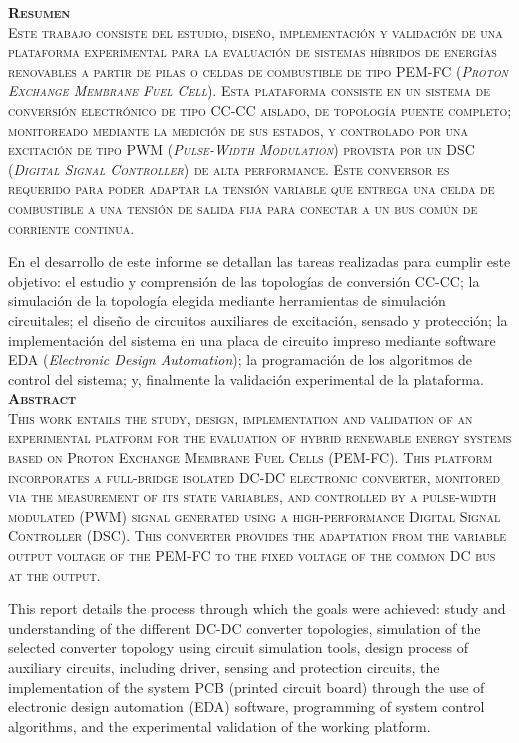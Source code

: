 \huge
\scshape
\textbf{Resumen}\\

\normalfont\normalsize
Este trabajo consiste del estudio, diseño, implementación y validación de una plataforma experimental para la evaluación de sistemas híbridos de energías renovables a partir de pilas o celdas de combustible de tipo PEM-FC (\textit{Proton Exchange Membrane Fuel Cell}). Esta plataforma consiste en un sistema de conversión electrónico de tipo CC-CC aislado, de topología puente completo; monitoreado mediante la medición de sus estados, y controlado por una excitación de tipo PWM (\textit{Pulse-Width Modulation}) provista por un DSC (\textit{Digital Signal Controller}) de alta performance. Este conversor es requerido para poder adaptar la tensión variable que entrega una celda de combustible a una tensión de salida fija para conectar a un bus común de corriente continua. 

En el desarrollo de este informe se detallan las tareas realizadas para cumplir este objetivo: el estudio y comprensión de las topologías de conversión CC-CC; la simulación de la topología elegida mediante herramientas de simulación circuitales; el diseño de circuitos auxiliares de excitación, sensado y protección; la implementación del sistema en una placa de circuito impreso mediante software EDA (\textit{Electronic Design Automation}); la programación de los algoritmos de control del sistema; y, finalmente la validación experimental de la plataforma.\\

\vspace{1cm}
\huge
\scshape
\textbf{Abstract}\\

\normalsize\normalfont
This work entails the study, design, implementation and validation of an experimental platform for the evaluation of hybrid renewable energy systems based on Proton Exchange Membrane Fuel Cells (PEM-FC). This platform incorporates a full-bridge isolated DC-DC electronic converter, monitored via the measurement of its state variables, and controlled by a pulse-width modulated (PWM) signal generated using a high-performance Digital Signal Controller (DSC). This converter provides the adaptation from the variable output voltage of the PEM-FC to the fixed voltage of the common DC bus at the output.

This report details the process through which the goals were achieved: study and understanding of the different DC-DC converter topologies, simulation of the selected converter topology using circuit simulation tools, design process of auxiliary circuits, including driver, sensing and protection circuits, the implementation of the system PCB (printed circuit board) through the use of electronic design automation (EDA) software, programming of system control algorithms, and the experimental validation of the working platform.\\ 